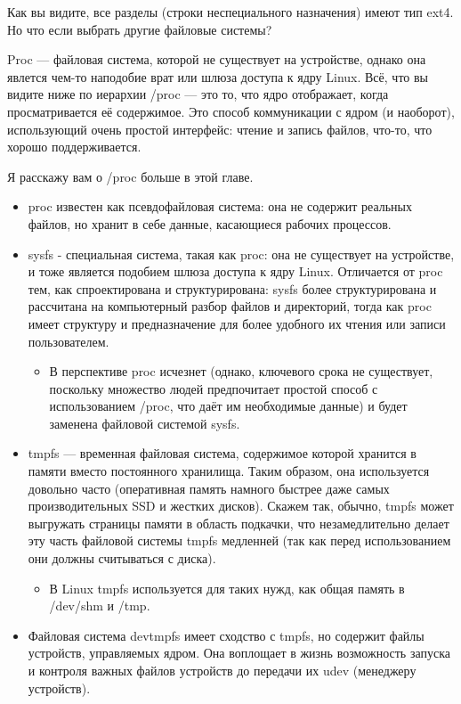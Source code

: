 \documentclass[10pt]{book}
\begin{document}
Как вы видите, все разделы (строки неспециального назначения) имеют тип ext4. Но что если выбрать другие файловые системы?

Proc — файловая система, которой не существует на устройстве, однако она явлется чем-то наподобие врат или шлюза доступа к ядру Linux. Всё, что вы видите ниже по иерархии /proc — это то, что ядро отображает, когда  просматривается её содержимое. Это способ коммуникации с ядром (и наоборот), использующий очень простой интерфейс: чтение и запись файлов, что-то, что хорошо поддерживается.

Я расскажу вам о /proc больше в этой главе.

\begin{itemize}
  \item proc известен как псевдофайловая система: она не содержит реальных файлов, но хранит в себе данные, касающиеся рабочих процессов.
  \item sysfs - специальная система, такая как proc: она не существует на устройстве, и тоже является подобием шлюза доступа к ядру Linux. Отличается от proc тем, как спроектирована и структурирована: sysfs более структурирована и рассчитана на компьютерный разбор файлов и директорий, тогда как proc имеет структуру и предназначение для более удобного их чтения или записи пользователем.
  \begin{itemize}
    \item В перспективе proc исчезнет (однако, ключевого срока не существует, поскольку множество людей предпочитает простой способ с использованием /proc, что даёт  им необходимые данные) и будет заменена файловой системой sysfs.
  \end{itemize}
  \item tmpfs — временная файловая система, содержимое которой хранится в памяти вместо постоянного хранилища. Таким образом, она используется довольно часто (оперативная память намного быстрее даже самых производительных SSD и жестких дисков). Скажем так, обычно, tmpfs может выгружать страницы памяти в область подкачки, что незамедлительно делает эту часть файловой системы tmpfs медленней (так как  перед использованием они должны считываться с диска).
  \begin{itemize}
    \item В Linux tmpfs используется для таких нужд, как общая память в /dev/shm и /tmp.
  \end{itemize}
  \item Файловая система devtmpfs имеет сходство с tmpfs, но содержит файлы устройств, управляемых ядром. Она воплощает в жизнь возможность запуска и контроля важных файлов устройств до передачи их udev (менеджеру устройств).

\end{itemize}
\end{document}
